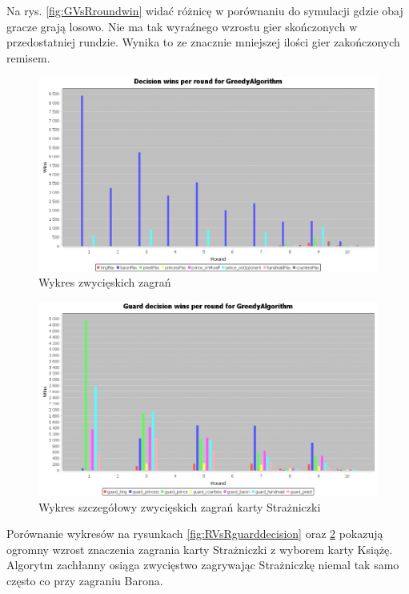 Na rys. \ref{fig:GVsRroundwin} widać różnicę w porównaniu do symulacji gdzie obaj gracze grają losowo. Nie ma tak wyraźnego wzrostu gier skończonych w przedostatniej rundzie. Wynika to ze znacznie mniejszej ilości gier zakończonych remisem.

\clearpage
\begin{figure}[H]
	\centering
	\includegraphics[width=\textwidth]{Resources/GVsR/GVsRdecision.PNG}
	\caption{Wykres zwycięskich zagrań} 
	\label{fig:GVsRdecision}
\end{figure} 

\begin{figure}[H]
	\centering
	\includegraphics[width=\textwidth]{Resources/GVsR/GVsRguarddecision.PNG}
	\caption{Wykres szczegółowy zwycięskich zagrań karty Strażniczki} 
	\label{fig:GVsRguarddecision}
\end{figure}

Porównanie wykresów na rysunkach \ref{fig:RVsRguarddecision} oraz \ref{fig:GVsRguarddecision} pokazują ogromny wzrost znaczenia zagrania karty Strażniczki z wyborem karty Książę. Algorytm zachłanny osiąga zwycięstwo zagrywając Strażniczkę niemal tak samo często co przy zagraniu Barona.

